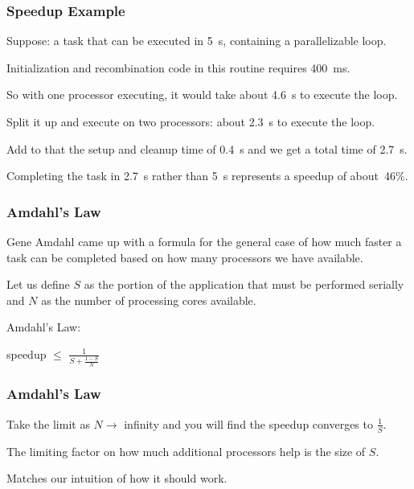 \begin{frame}
	\frametitle{Speedup Example}


	Suppose: a task that can be executed in 5~s, containing a parallelizable loop.

	Initialization and recombination code in this routine requires 400~ms.

	So with one processor executing, it would take about 4.6~s to execute the loop.

	Split it up and execute on two processors: about 2.3~s to execute the loop.

	Add to that the setup and cleanup time of 0.4~s and we get a total time of 2.7~s.

	Completing the task in 2.7~s rather than 5~s represents a speedup of about~46\%.

\end{frame}


\begin{frame}
	\frametitle{Amdahl's Law}

	Gene Amdahl came up with a formula for the general case of how much faster a task can be completed based on how many processors we have available.

	Let us define $S$ as the portion of the application that must be performed serially and $N$ as the number of processing cores available.

	Amdahl's Law:

	\begin{center}
		speedup $\leq$ {\huge $\frac{1}{S + \frac{1-S}{N}}$}
	\end{center}

\end{frame}


\begin{frame}
	\frametitle{Amdahl's Law}

	Take the limit as $N \rightarrow$ infinity and you will find the speedup converges to $\frac{1}{S}$.


	The limiting factor on how much additional processors help is the size of $S$.

	Matches our intuition of how it should work.

\end{frame}


